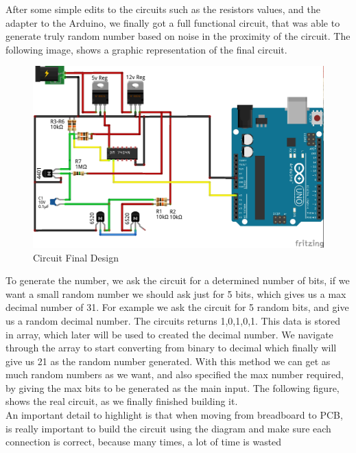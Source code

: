 \documentclass[twocolumn]{IEEEtran}
\begin{document}
\begin{enumerate}
    After some simple edits to the circuits such as the resistors values, and the adapter to the Arduino, we finally got a full functional circuit, that was able to generate truly random number based on noise in the proximity of the circuit. The following image, shows a graphic representation of the final circuit.
    \begin{figure}[h!]
	\centering
	\includegraphics[width=\columnwidth]{src/Rand_Final.jpg}
	\caption{Circuit Final Design}
	\end{figure}
    
    To generate the number, we ask the circuit for a determined number of bits, if we want a small random number we should ask just for 5 bits, which gives us a max decimal number of 31. For example we ask the circuit for 5 random bits, and give us a random decimal number. The circuits returns 1,0,1,0,1. This data is stored in array, which later will be used to created the decimal number. We navigate through the array to start converting from binary to decimal which finally will give us 21 as the random number generated. With this method we can get as much random numbers as we want, and also specified the max number required, by giving the max bits to be generated as the main input. The following figure, shows the real circuit, as we finally finished building it.\\ An important detail to highlight is that when moving from breadboard to PCB, is really important to build the circuit using the diagram and make sure each connection is correct, because many times, a lot of time is wasted
    
    
    	
\end{enumerate}
   
\end{document}
